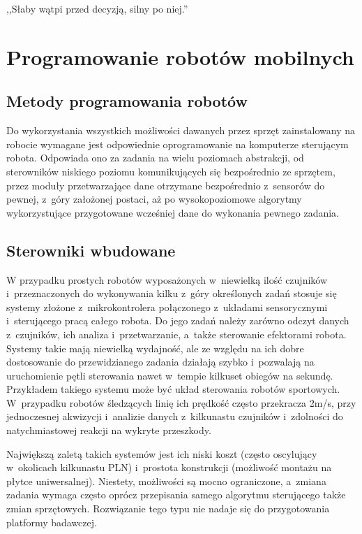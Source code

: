 

\begin{savequote}[70mm]
,,Słaby wątpi przed decyzją, silny po niej.''
\end{savequote}


\chapter{Programowanie robotów mobilnych}
\label{chap:programowanie}

\section{Metody programowania robotów}

Do wykorzystania wszystkich możliwości dawanych przez sprzęt zainstalowany na robocie
wymagane jest odpowiednie oprogramowanie na komputerze sterującym robota. Odpowiada
ono za zadania na wielu poziomach abstrakcji, od sterowników niskiego poziomu
komunikujących się bezpośrednio ze sprzętem, przez moduły przetwarzające dane otrzymane
bezpośrednio z~sensorów do pewnej, z~góry założonej postaci, aż po wysokopoziomowe
algorytmy wykorzystujące przygotowane wcześniej dane do wykonania pewnego zadania.

\section{Sterowniki wbudowane}

W przypadku prostych robotów wyposażonych w~niewielką ilość czujników
i~przeznaczonych do wykonywania kilku z~góry określonych zadań stosuje się systemy
złożone z~mikrokontrolera połączonego z~układami sensorycznymi i~sterującego pracą
całego robota. Do jego zadań należy zarówno odczyt danych z~czujników, ich analiza
i~przetwarzanie, a~także sterowanie efektorami robota. Systemy takie mają niewielką
wydajność, ale ze względu na ich dobre dostosowanie do przewidzianego zadania działają
szybko i~pozwalają na uruchomienie pętli sterowania nawet w~tempie kilkuset obiegów na sekundę.
Przykładem takiego systemu może być układ sterowania robotów sportowych. W~przypadku
robotów śledzących linię ich prędkość często przekracza 2m/s, przy jednoczesnej
akwizycji i~analizie danych z~kilkunastu czujników i~zdolności do natychmiastowej
reakcji na wykryte przeszkody.

Największą zaletą takich systemów jest ich niski koszt (często oscylujący w~okolicach
kilkunastu PLN) i~prostota konstrukcji (możliwość montażu na płytce uniwersalnej).
Niestety, możliwości są mocno ograniczone, a~zmiana zadania wymaga często oprócz przepisania
samego algorytmu sterującego także zmian sprzętowych. Rozwiązanie tego typu nie nadaje
się do przygotowania platformy badawczej.

